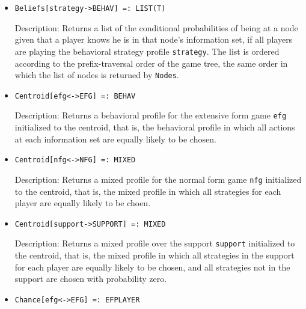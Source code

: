 \begin{itemize}
\item
\protect \large \begin{verbatim}
Beliefs[strategy->BEHAV] =: LIST(T)
\end{verbatim}\normalsize

\bd
\item
[Description:] Returns a list of the conditional probabilities of
being at a node given that a player knows he is in that node's information
set, if all players are playing the behavioral strategy profile
\verb+strategy+.  The list is ordered according to the prefix-traversal
order of the game tree, the same order in which the list of nodes is
returned by {\tt Nodes}.
\ed



\item
\protect \large \begin{verbatim} 
Centroid[efg<->EFG] =: BEHAV
\end{verbatim}\normalsize

\bd
\item
[Description:] Returns a behavioral profile for the extensive form
game \verb+efg+ initialized to the centroid, that is, the behavioral
profile in which all actions at each information set are equally
likely to be chosen.
\ed

\item
\protect \large \begin{verbatim}
Centroid[nfg<->NFG] =: MIXED
\end{verbatim}\normalsize

\bd
\item
[Description:] Returns a mixed profile for the normal form game \verb+nfg+
initialized to the centroid, that is, the mixed profile in which all
strategies for each player are equally likely to be choen.
\ed

\item
\protect \large \begin{verbatim}
Centroid[support->SUPPORT] =: MIXED
\end{verbatim}\normalsize

\bd
\item
[Description:] Returns a mixed profile over the support \verb+support+
initialized to the centroid, that is, the mixed profile in which 
all strategies in the support for each player are equally likely to be
chosen, and all strategies not in the support are chosen with probability
zero.
\ed

\item
\protect \large \begin{verbatim}
Chance[efg<->EFG] =: EFPLAYER
\end{verbatim}\normalsize


\end{itemize}
